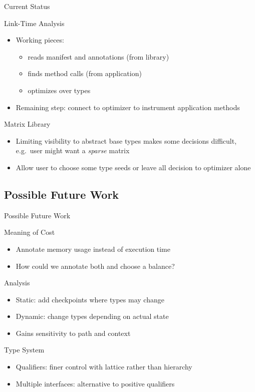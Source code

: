 \documentclass{beamer}
\begin{document}
\begin{frame}{Current Status}
  \begin{block}{Link-Time Analysis}
    \begin{itemize}
    \item Working pieces:
      \begin{itemize}
      \item reads manifest and annotations (from library)
      \item finds method calls (from application)
      \item optimizes over types
      \end{itemize}
    \item Remaining step: connect to optimizer to instrument application methods
    \end{itemize}
  \end{block}
\pause
  \begin{block}{Matrix Library}
    \begin{itemize}
    \item Limiting visibility to abstract base types makes some decisions difficult, e.g.\ user might want a {\it sparse} matrix
    \item Allow user to choose some type seeds or leave all decision to optimizer alone
    \end{itemize}
  \end{block}
\end{frame}

\subsection{Possible Future Work}

\begin{frame}{Possible Future Work}
  \begin{block}{Meaning of Cost}
    \begin{itemize}
    \item Annotate memory usage instead of execution time
    \item How could we annotate both and choose a balance?
    \end{itemize}
  \end{block}
\pause
  \begin{block}{Analysis}
    \begin{itemize}
    \item Static: add checkpoints where types may change
    \item Dynamic: change types depending on actual state
    \item Gains sensitivity to path and context
    \end{itemize}
  \end{block}
\pause
  \begin{block}{Type System}
    \begin{itemize}
    \item Qualifiers: finer control with lattice rather than hierarchy
    \item Multiple interfaces: alternative to positive qualifiers
    \end{itemize}
  \end{block}
\end{frame}
\end{document}
